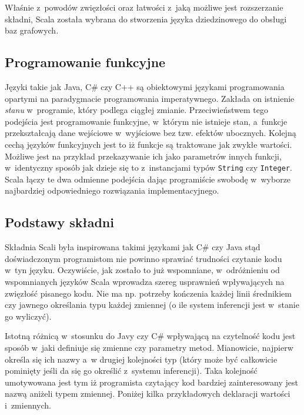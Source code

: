 \documentclass[brudnopis]{xmgr}
\begin{document}
Właśnie z~powodów zwięzłości oraz łatwości z~jaką możliwe jest rozszerzanie składni, Scala została wybrana do stworzenia języka dziedzinowego do obsługi baz grafowych.

\subsection{Programowanie funkcyjne}

Języki takie jak Java, C\# czy C++ są obiektowymi językami programowania opartymi na paradygmacie programowania imperatywnego. Zakłada on istnienie \textit{stanu} w~programie, który podlega ciągłej zmianie. Przeciwieństwem tego podejścia jest programowanie funkcyjne, w~którym nie istnieje stan, a~funkcje przekształcają dane wejściowe w~wyjściowe bez tzw. efektów ubocznych. Kolejną cechą języków funkcyjnych jest to iż funkcje są traktowane jak zwykłe wartości. Możliwe jest na przykład przekazywanie ich jako parametrów innych funkcji, w~identyczny sposób jak dzieje się to z~instancjami typów \texttt{String} czy \texttt{Integer}. Scala łączy te dwa odmienne podejścia dając programiście swobodę w~wyborze najbardziej odpowiedniego rozwiązania implementacyjnego.

\subsection{Podstawy składni}
Składnia Scali była inspirowana takimi językami jak C\# czy Java stąd doświadczonym programistom nie powinno sprawiać trudności czytanie kodu w~tyn języku. Oczywiście, jak zostało to już wspomniane, w~odróżnieniu od wspomnianych języków Scala wprowadza szereg usprawnień wpływających na zwięzłość pisanego kodu. Nie ma np. potrzeby kończenia każdej linii średnikiem czy jawnego określania typu każdej zmiennej (o ile system inferencji jest w~stanie go wyliczyć).

Istotną różnicą w~stosunku do Javy czy C\# wpływającą na czytelność kodu jest sposób w~jaki definiuje się zmienne czy parametry metod. Mianowicie, najpierw określa się ich nazwy a~w drugiej kolejności typ (który może być całkowicie pominięty jeśli da się go określić z~systemu inferencji). Taka kolejność umotywowana jest tym iż programista czytający kod bardziej zainteresowany jest nazwą aniżeli typem zmiennej. Poniżej kilka przykładowych deklaracji wartości i~zmiennych.

\newpage

\inputminted{scala}{listings/scala/val-var-declarations.scala}
\end{document}
